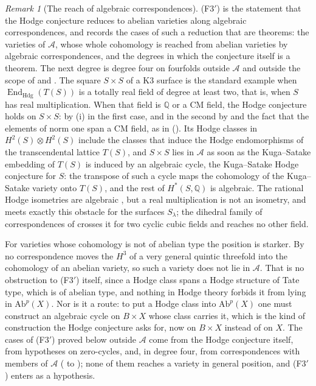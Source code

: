 \documentclass[11pt,reqno]{amsart}
\theoremstyle{plain}
\theoremstyle{definition}
\theoremstyle{remark}
\newtheorem{remark}[theorem]{Remark}
\newcommand{\QQ}{\mathbb{Q}}
\DeclareMathOperator{\End}{End}
\begin{document}
\begin{remark}[The reach of algebraic correspondences]\label{rem:f3primeopen}
\textup{(F3$'$)} is the statement that the Hodge conjecture reduces to
abelian varieties along algebraic correspondences, and
 records the cases of such a reduction that are theorems:
the varieties of $\mathcal{A}$, whose whole cohomology is reached from abelian
varieties by algebraic correspondences, and the degrees in which the
conjecture itself is a theorem. The next degree is degree four on fourfolds
outside $\mathcal{A}$ and outside the scope of  and
. The square $S\times S$ of a K3 surface is the standard
example when $\End_{\mathrm{Hdg}}(T(S))$ is a totally real field of degree
at least two, that is, when $S$ has real multiplication. When that field is
$\QQ$ or a CM field, the Hodge conjecture holds on $S\times S$: by
(i) in the first case, and in the second by
\cite{Bus19} and the fact that the elements of norm one span a CM field, as in
\cite{RM08} (). Its Hodge classes in
$H^{2}(S)\otimes H^{2}(S)$ include the classes
that induce the Hodge endomorphisms of the transcendental lattice $T(S)$, and
$S\times S$ lies in $\mathcal{A}$ as soon as the Kuga--Satake embedding of
$T(S)$ is induced by an algebraic cycle, the Kuga--Satake Hodge conjecture for
$S$: the transpose of such a cycle maps the
cohomology of the Kuga--Satake variety onto $T(S)$, and the rest of
$H^{*}(S,\QQ)$ is algebraic. The rational Hodge isometries are algebraic
\cite{Bus19}, but a real multiplication is not an isometry, and
 meets exactly this obstacle for the surfaces
$S_{\lambda}$; the dihedral family of correspondences of \cite{BB26dense} crosses it
for two cyclic cubic fields and reaches no other field.

For varieties whose cohomology is not of abelian type the position is
starker. By  no correspondence moves the $H^{3}$ of a
very general quintic threefold into the cohomology of an abelian variety, so
such a variety does not lie in $\mathcal{A}$. That is no obstruction to
\textup{(F3$'$)} itself, since a Hodge class spans a Hodge structure of Tate
type, which is of abelian type, and nothing in Hodge theory forbids it from
lying in $\mathrm{Ab}^{p}(X)$. Nor is it a route: to put a Hodge class into
$\mathrm{Ab}^{p}(X)$ one must construct an algebraic cycle on $B\times X$
whose class carries it, which is the kind of construction the Hodge
conjecture asks for, now on $B\times X$ instead of on $X$. The cases of
\textup{(F3$'$)} proved below outside $\mathcal{A}$ come from the Hodge
conjecture itself, from hypotheses on zero-cycles, and, in degree four, from
correspondences with members of $\mathcal{A}$
( to ); none of them reaches a
variety in general position, and \textup{(F3$'$)} enters  as
a hypothesis.
\end{remark}
\end{document}
